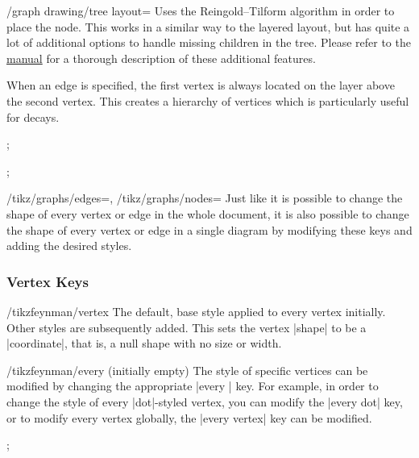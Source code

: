 \documentclass[a4paper,final]{ltxdoc}
\providecommand{\pgfmanual}{\href{http://mirrors.ctan.org/graphics/pgf/base/doc/pgfmanual.pdf}{\tikzname{} manual}}
\begin{document}
\begin{key}{/graph drawing/tree layout=}
  Uses the Reingold--Tilform algorithm in order to place the node.  This works
  in a similar way to the layered layout, but has quite a lot of additional
  options to handle missing children in the tree.  Please refer to the
  \pgfmanual{} for a thorough description of these additional features.

  When an edge is specified, the first vertex is always located on the layer
  above the second vertex.  This creates a hierarchy of vertices which is
  particularly useful for decays.

\begin{codeexample}[]
;
\end{codeexample}
\begin{codeexample}[]
;
\end{codeexample}
\end{key}

\begin{keylist}{%
  /tikz/graphs/edges=,
  /tikz/graphs/nodes=}
  Just like it is possible to change the shape of every vertex or edge in the
  whole document, it is also possible to change the shape of every vertex or
  edge in a single diagram by modifying these keys and adding the desired
  styles.
\end{keylist}

\subsubsection{Vertex Keys}
\label{subsubsec:vertex_keys}

\begin{key}{/tikzfeynman/vertex}
  The default, base style applied to every vertex initially.  Other styles
  are subsequently added.  This sets the vertex |shape| to be a |coordinate|,
  that is, a null shape with no size or width.
\end{key}

\begin{stylekey}{/tikzfeynman/every  (initially \normalfont empty)}
  The style of specific vertices can be modified by changing the appropriate
  |every | key.  For example, in order to change the style of
  every |dot|-styled vertex, you can modify the |every dot| key, or to modify
  every vertex globally, the |every vertex| key can be modified.

\begin{codeexample}[]
;
\end{codeexample}
\end{stylekey}
\end{document}
